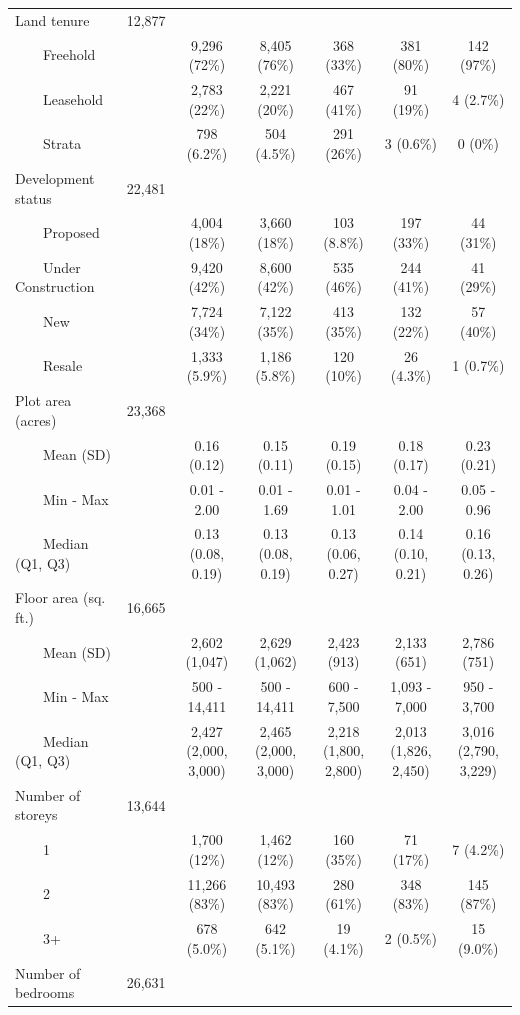 \documentclass[
  number]{elsarticle}
\begin{document}
\begin{landscape}
\begin{table}
{\begin{tabular*}{\linewidth}{@{\extracolsep{\fill}}lcccccc}
Land tenure & 12,877 &  &  &  &  &  \\ 
    Freehold &  & 9,296 (72\%) & 8,405 (76\%) & 368 (33\%) & 381 (80\%) & 142 (97\%) \\ 
    Leasehold &  & 2,783 (22\%) & 2,221 (20\%) & 467 (41\%) & 91 (19\%) & 4 (2.7\%) \\ 
    Strata &  & 798 (6.2\%) & 504 (4.5\%) & 291 (26\%) & 3 (0.6\%) & 0 (0\%) \\ 
Development status & 22,481 &  &  &  &  &  \\ 
    Proposed &  & 4,004 (18\%) & 3,660 (18\%) & 103 (8.8\%) & 197 (33\%) & 44 (31\%) \\ 
    Under Construction &  & 9,420 (42\%) & 8,600 (42\%) & 535 (46\%) & 244 (41\%) & 41 (29\%) \\ 
    New &  & 7,724 (34\%) & 7,122 (35\%) & 413 (35\%) & 132 (22\%) & 57 (40\%) \\ 
    Resale &  & 1,333 (5.9\%) & 1,186 (5.8\%) & 120 (10\%) & 26 (4.3\%) & 1 (0.7\%) \\ 
Plot area (acres) & 23,368 &  &  &  &  &  \\ 
    Mean (SD) &  & 0.16 (0.12) & 0.15 (0.11) & 0.19 (0.15) & 0.18 (0.17) & 0.23 (0.21) \\ 
    Min - Max &  & 0.01 - 2.00 & 0.01 - 1.69 & 0.01 - 1.01 & 0.04 - 2.00 & 0.05 - 0.96 \\ 
    Median (Q1, Q3) &  & 0.13 (0.08, 0.19) & 0.13 (0.08, 0.19) & 0.13 (0.06, 0.27) & 0.14 (0.10, 0.21) & 0.16 (0.13, 0.26) \\ 
Floor area (sq. ft.) & 16,665 &  &  &  &  &  \\ 
    Mean (SD) &  & 2,602 (1,047) & 2,629 (1,062) & 2,423 (913) & 2,133 (651) & 2,786 (751) \\ 
    Min - Max &  & 500 - 14,411 & 500 - 14,411 & 600 - 7,500 & 1,093 - 7,000 & 950 - 3,700 \\ 
    Median (Q1, Q3) &  & 2,427 (2,000, 3,000) & 2,465 (2,000, 3,000) & 2,218 (1,800, 2,800) & 2,013 (1,826, 2,450) & 3,016 (2,790, 3,229) \\ 
Number of storeys & 13,644 &  &  &  &  &  \\ 
    1 &  & 1,700 (12\%) & 1,462 (12\%) & 160 (35\%) & 71 (17\%) & 7 (4.2\%) \\ 
    2 &  & 11,266 (83\%) & 10,493 (83\%) & 280 (61\%) & 348 (83\%) & 145 (87\%) \\ 
    3+ &  & 678 (5.0\%) & 642 (5.1\%) & 19 (4.1\%) & 2 (0.5\%) & 15 (9.0\%) \\ 
Number of bedrooms & 26,631 &  &  &  &  &  \\ 

\end{tabular*}}
\end{table}
\end{landscape}
\end{document}
